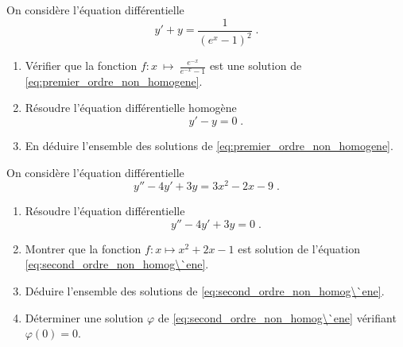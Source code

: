 \begin{exo}
On consid\`ere l'\'equation diff\'erentielle 
\begin{equation}
y' + y = \frac{1}{{\left(e^{x} - 1\right)}^{2}} \; .
\label{eq:premier_ordre_non_homogene}
\end{equation}
\begin{enumerate}
\item V\'erifier que la fonction $f : x \ {\mapsto}\  \frac{e^{-x}}{e^{-x} - 1}$ 
      est une solution de \eqref{eq:premier_ordre_non_homogene}. 
\item R\'esoudre l'\'equation diff\'erentielle homog\`ene 
      \begin{equation}
      y' - y = 0 \; .
      \label{eq:premier_ordre_homogene}
      \end{equation}
\item En d\'eduire l'ensemble des solutions de \eqref{eq:premier_ordre_non_homogene}.
\end{enumerate}
\end{exo}



\begin{exo}
On consid\`ere l'\'equation diff\'erentielle 
      \begin{equation}
      y'' - 4 y' + 3y = 3 x^2 - 2 x - 9 \; .
      \label{eq:second_ordre_non_homog\`ene}
      \end{equation}
\begin{enumerate}
\item R\'esoudre l'\'equation diff\'erentielle 
      \begin{equation*}
      y'' - 4 y' + 3y = 0 \; .
      \label{eq:second_ordre_homog\`ene}
      \end{equation*}
\item Montrer que la fonction $f : x \mapsto x^2 + 2 x - 1$ 
      est solution de l'\'equation \eqref{eq:second_ordre_non_homog\`ene}.
\item D\'eduire l'ensemble des solutions de \eqref{eq:second_ordre_non_homog\`ene}.
\item D\'eterminer une solution $\varphi$ de \eqref{eq:second_ordre_non_homog\`ene} v\'erifiant $\varphi (0) = 0$.
\end{enumerate}
\end{exo}

